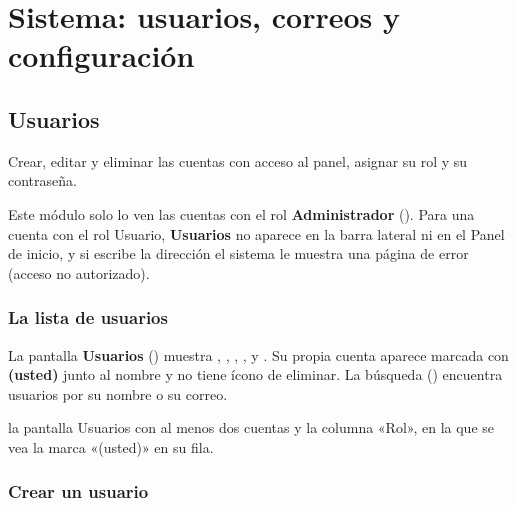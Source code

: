 \chapter{Sistema: usuarios, correos y configuración}\label{cap:sistema}


\section{Usuarios}\label{sec:usuarios}

  {Crear, editar y eliminar las cuentas con acceso al panel, asignar su rol y su contraseña.}

\begin{importante}
Este módulo solo lo ven las cuentas con el rol \textbf{Administrador} (). Para
una cuenta con el rol Usuario, \textbf{Usuarios} no aparece en la barra lateral ni en el Panel de
inicio, y si escribe la dirección  el sistema le muestra una página de
error (acceso no autorizado).
\end{importante}

\subsection{La lista de usuarios}

La pantalla \textbf{Usuarios} () muestra
, , , ,  y . Su propia
cuenta aparece marcada con \textbf{(usted)} junto al nombre y no tiene ícono de eliminar. La búsqueda () encuentra usuarios por su nombre o su correo.

  {la pantalla Usuarios con al menos dos cuentas y la columna «Rol», en la que se vea la marca
   «(usted)» en su fila.}

\subsection{Crear un usuario}\label{sec:usuario-crear}

